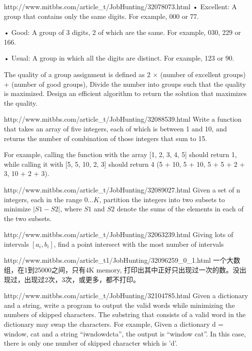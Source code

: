 \documentclass[a4paper]{article}
\begin{document}
\begin{CJK}{UTF8}{gbsn}
\begin{enumerate}
\begin{Q}[Google]{http://www.mitbbs.com/article_t/JobHunting/32078073.html}
• Excellent: A group that contains only the same digits. For example, 000 or 77.

• Good: A group of 3 digits, 2 of which are the same. For example, 030, 229 or 166.

• Usual: A group in which all the digits are distinct. For example, 123 or 90.

The quality of a group assignment is defined as 2 × (number of excellent groups) + (number of good groups), Divide the number into groups such that the quality is maximized. Design an efficient algorithm to return the solution that maximizes the quality.
\end{Q}

\begin{Q}{http://www.mitbbs.com/article_t/JobHunting/32088539.html}
Write a function that takes an array of five integers, each of which is between 1 and 10, and returns the number of combination of those integers that sum to 15. 

For example, calling the function with the array [1, 2, 3, 4, 5] should return 1, while calling it with [5, 5, 10, 2, 3] should return 4 (5 + 10, 5 + 10, 5 + 5 + 2 + 3, 10 + 2 + 3).
\end{Q}

\begin{Q}{http://www.mitbbs.com/article_t/JobHunting/32089027.html}
Given a set of n integers, each in the range $0 \ldots K$, partition the integers into two subsets to minimize $|S1 - S2|$, where $S1$ and $S2$ denote the sums of the elements in each of the two subsets.
\end{Q}

\begin{Q}[Facebook]{http://www.mitbbs.com/article_t/JobHunting/32063239.html}
Giving lots of intervals $[a_i, b_i]$, find a point intersect with the most number of intervals
\end{Q}

\begin{Q}{http://www.mitbbs.com/article_t1/JobHunting/32096259_0_1.html}
一个大数组，在1到25000之间，只有4K memory, 打印出其中正好只出现过一次的数。没出现过，出现过2次，3次，或更多，都不打印。
\end{Q}

\begin{Q}[Google]{http://www.mitbbs.com/article_t/JobHunting/32104785.html}
Given a dictionary and a string, write a program to output the valid words while minimizing the numbers of skipped characters. The substring that consists of a valid word in the dictionary may swap the characters. For example, Given a dictionary d = {window, cat} and a string ``iwndowdcta'', the output is ``window cat''. In this case, there is only one number of skipped character which is 'd'. 
\end{Q}


\end{enumerate}
\end{CJK}
\end{document}
